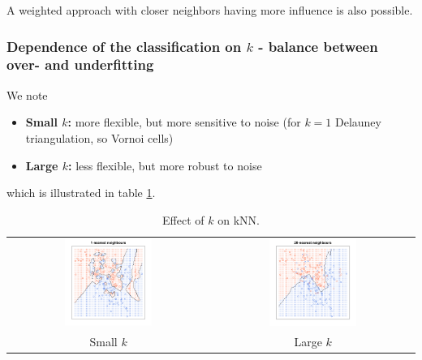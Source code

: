A weighted approach with closer neighbors having more influence is also possible.

\subsubsection{Dependence of the classification on $k$ - balance between over- and underfitting}
We note
\begin{itemize}
    \item \textbf{Small $k$:} more flexible, but more sensitive to noise (for $k=1$ Delauney triangulation, so Vornoi cells)
    \item \textbf{Large $k$:} less flexible, but more robust to noise
\end{itemize}
which is illustrated in table \ref{tab:knn_k}.

\begin{table}[H]
    \centering
    \begin{tabular}{c|c}
        \includegraphics[width=0.45\textwidth]{figures/knn_small_k.png} & \includegraphics[width=0.45\textwidth]{figures/knn_large_k.png} \\
        Small $k$ & Large $k$
    \end{tabular}
    \caption{Effect of $k$ on kNN.}
    \label{tab:knn_k}
\end{table}

